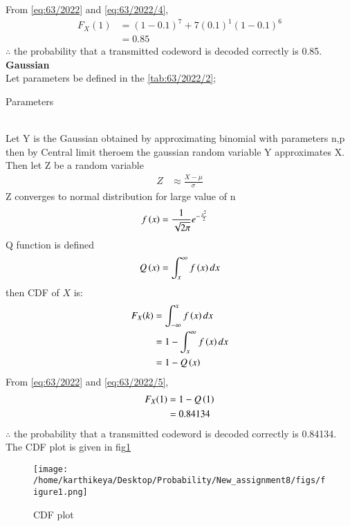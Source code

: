 \documentclass[article]{IEEEtran}
\theoremstyle{remark}
\begin{document}
From \eqref{eq:63/2022} and \eqref{eq:63/2022/4}, 
\begin{align}
    F_X(1) &= (1-0.1)^{7}+7(0.1)^1(1-0.1)^{6} \\
    &= 0.85
\end{align}
$\therefore$ the probability that a transmitted codeword is decoded correctly is 0.85.
\newpage
\textbf{Gaussian}\\
Let parameters be defined in the \autoref{tab:63/2022/2};
\begin{table}[h]
	\centering
	
	\caption{Parameters}
        \label{tab:63/2022/2}
\end{table}
\\Let Y is the Gaussian obtained by approximating binomial with parameters n,p then by Central limit theroem the gaussian random variable Y approximates X. Then let Z be a random variable
\begin{align}
	Z&\approx\frac{X- \mu}{\sigma}
\end{align}
Z converges to normal distribution for large value of n
\begin{align}
	f\left(x\right)&=\frac{1}{\sqrt{2\pi}}e^{-\frac{x^2}{2}}
\end{align}
Q function is defined
\begin{align}
	Q\left(x\right)=\int_x^{\infty}f\left(x\right)dx
\end{align}
then CDF of $X$ is:
\begin{align}
	F_X(k)&=\int_{-\infty}^x f\left(x\right) dx\\
	&=1-\int_x^{\infty}f\left(x\right)dx\\
	&=1-Q\left(x\right) \label{eq:63/2022/5}
\end{align}
From \eqref{eq:63/2022} and \eqref{eq:63/2022/5}, 
\begin{align}
	F_X(1)&=1-Q\left(1\right) \\
	&= 0.84134
\end{align}
$\therefore$ the probability that a transmitted codeword is decoded correctly is 0.84134.
The CDF plot is given in fig\ref{fig:63/2022}
\begin{figure}[ht!]
    \centering
    \texttt{[image: /home/karthikeya/Desktop/Probability/New\_assignment8/figs/figure1.png]}
    \caption{CDF plot}
    \label{fig:63/2022}
\end{figure}
\end{document}
